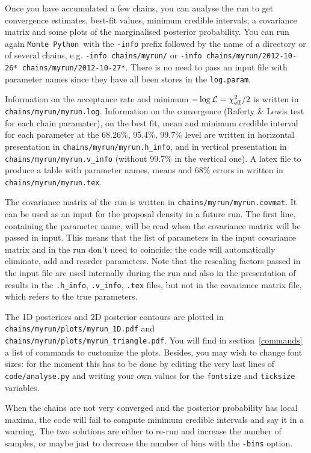\documentclass[10pt]{article}
\newcommand{\MP}{\texttt{Monte Python}}
\begin{document}
Once you have accumulated a few chains, you can analyse the run to get convergence estimates, best-fit values, minimum credible intervals, a covariance matrix  and some plots of the marginalised posterior probability. You can run again \MP~with the \verb?-info? prefix followed by the name of a directory or of several chains, e.g.
\verb?-info chains/myrun/? or \verb?-info chains/myrun/2012-10-26* chains/myrun/2012-10-27*?.
There is no need to pass an input file with parameter names since they have all been stores in the \verb?log.param?.

Information on the acceptance rate and minimum $-\log{\cal L}=\chi^2_{\rm eff}/2$ is written in \verb?chains/myrun/myrun.log?. Information on the convergence (Raferty \& Lewis test for each chain paramater), on the best fit, mean and minimum credible interval for each parameter at the 68.26\%, 95.4\%, 99.7\% level are written in horizontal presentation in \verb?chains/myrun/myrun.h_info?, and in vertical presentation in \verb?chains/myrun/myrun.v_info? (without 99.7\% in the vertical one). A latex file to produce a table with parameter names, means and 68\% errors in written in \verb?chains/myrun/myrun.tex?.

The covariance matrix of the run is written in \verb?chains/myrun/myrun.covmat?. It can be used as an input for the proposal density in a future run. The first line, containing the parameter name, will be read when the covariance matrix will be passed in input. This means that 
the list of parameters in the input covariance matrix and in the run don't need to coincide: the code will automatically eliminate, add and reorder parameters. Note that the rescaling factors passed in the input file are used internally during the run and also in the presentation of results in the \verb?.h_info?, \verb?.v_info?, \verb?.tex? files, but not in the covariance matrix file, which refers to the true parameters.

The 1D posteriors and 2D posterior contours are plotted in \verb?chains/myrun/plots/myrun_1D.pdf? and \verb?chains/myrun/plots/myrun_triangle.pdf?. You will find in section~\ref{commands} a list of commands to customize the plots. Besides, you may wish to change font sizes: for the moment this has to be done by editing the very last lines of \verb?code/analyse.py? and writing your own values for the \verb?fontsize? and \verb?ticksize? variables.

When the chains are not very converged and the posterior probability has local maxima, the code will fail to compute minimum credible intervals and say it in a warning. The two solutions are either to re-run and increase the number of samples, or maybe just to decrease the number of bins with the \verb?-bins? option.
\end{document}

